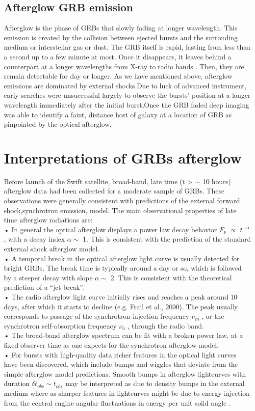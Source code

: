 \subsection{Afterglow GRB emission}
Afterglow is the phase of GRBs that slowly fading at longer wavelength. This
emission is created by the collision between ejected bursts and the surronding
medium or interstellar gas or dust. The GRB itself is rapid, lasting from less than a second up to a few minute at most. Once it disappears, it leaves behind a counterpart
at a longer wavelengths from X-ray to radio bands . Then, they are remain
detectable for day or longer. As we have mentioned above, afterglow emissions are
dominated by external shocks.Due to luck of advanced instrument, early searches
were unsuccessful largely to observe the bursts’ position at a longer wavelength
immediately after the initial burst,Once the GRB faded deep imaging was able to
identify a faint, distance host of galaxy at a location of GRB as pinpointed by the
optical afterglow.\citep{15}\citep{22}\citep{23} 
\section{Interpretations of GRBs afterglow }
Before launch of the Swift satellite, broad-band, late time (t > $ \sim $ 10 hours) afterglow data had been collected for a moderate sample of GRBs. These observations were generally consistent with predictions of the external forward shock,synchrotron emission, model. The main observational properties of late time afterglow radiations are:\\
• In general the optical afterglow displays a power law decay behavior $ F_{\nu} $ $ \propto $ $ t^{-\alpha} $   , with a decay index $ \alpha \sim $ 1. This is consistent with the prediction of the standard external shock afterglow model.\\
• A temporal break in the optical afterglow light curve is usually detected for bright GRBs. The break time is typically around a day or so, which is followed by a steeper decay with slope $ \alpha  \sim $ 2. This is consistent with the theoretical prediction of a “jet break”.\\
• The radio afterglow light curve initially rises and reaches a peak around
10 days, after which it starts to decline (e.g. Frail et al., 2000). The peak
usually corresponds to passage of the synchrotron injection frequency $ \nu_{m} $ ,
or the synchrotron self-absorption frequency $ \nu_{a} $ , through the radio band.\\
• The broad-band afterglow spectrum can be fit with a broken power law, at
a fixed observer time as one expects for the synchrotron afterglow model.\\
• For bursts with high-quality data richer features in the optical light curves have been discovered, which include bumps and wiggles that deviate from the simple afterglow model predictions. Smooth bumps in afterglow lightcurves with duration $ \delta  t _{obs}  \sim  t_{obs} $ may be interpreted as due to density bumps in the external medium  where as sharper features in lightcurves might be due to energy injection from the central engine  angular fluctuations in energy per unit solid angle \citep{18}.
